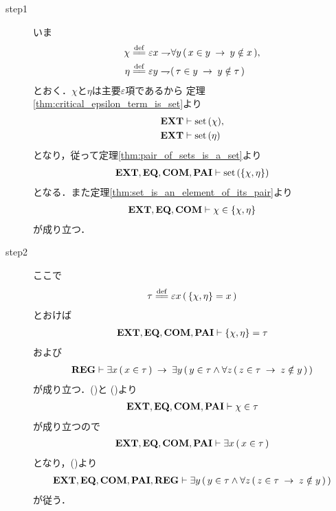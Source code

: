 	\begin{sketch}\mbox{}
		\begin{description}
			\item[step1] いま
				\begin{align}
					\chi &\defeq \varepsilon x \negation \forall y\, (\, x \in y \rarrow y \notin x\, ), \\
					\eta &\defeq \varepsilon y \negation (\, \tau \in y \rarrow y \notin \tau\, )
				\end{align}
				とおく．$\chi$と$\eta$は主要$\varepsilon$項であるから
				定理\ref{thm:critical_epsilon_term_is_set}より
				\begin{align}
					\mbox{{\bf EXT}} &\vdash \operatorname*{set}\hspace{0.15em}(\chi), \\
					\mbox{{\bf EXT}} &\vdash \operatorname*{set}\hspace{0.15em}(\eta)
				\end{align}
				となり，従って定理\ref{thm:pair_of_sets_is_a_set}より
				\begin{align}
					\mbox{{\bf EXT}},\mbox{{\bf EQ}},\mbox{\bf COM},\mbox{{\bf PAI}} \vdash \operatorname*{set}\hspace{0.15em}(\{\chi,\eta\})
				\end{align}
				となる．また定理\ref{thm:set_is_an_element_of_its_pair}より
				\begin{align}
					\mbox{{\bf EXT}},\mbox{{\bf EQ}},\mbox{\bf COM} \vdash \chi \in \{\chi,\eta\}
					\label{fom:no_pair_of_sets_go_round_1}
				\end{align}
				が成り立つ．
				
			\item[step2] ここで
				\begin{align}
					\tau \defeq \varepsilon x\, (\, \{\chi,\eta\} = x\, )
				\end{align}
				とおけば
				\begin{align}
					\mbox{{\bf EXT}},\mbox{{\bf EQ}},\mbox{\bf COM},\mbox{{\bf PAI}} \vdash \{\chi,\eta\} = \tau
					\label{fom:no_pair_of_sets_go_round_2}
				\end{align}
				および
				\begin{align}
					\mbox{{\bf REG}} \vdash \exists x\, (\, x \in \tau\, ) 
					\hspace{0.25em}\rightarrow\hspace{0.25em} \exists y\, (\, y \in \tau \wedge \forall z\, (\, z \in \tau 
					\hspace{0.25em}\rightarrow\hspace{0.25em} z \notin y\, )\, )
					\label{fom:no_pair_of_sets_go_round_3}
				\end{align}
				が成り立つ．()と
				()より
				\begin{align}
					\mbox{{\bf EXT}},\mbox{{\bf EQ}},\mbox{\bf COM},\mbox{{\bf PAI}} \vdash \chi \in \tau
					\label{fom:no_pair_of_sets_go_round_6}
				\end{align}
				が成り立つので%
				\begin{align}
					\mbox{{\bf EXT}},\mbox{{\bf EQ}},\mbox{\bf COM},\mbox{{\bf PAI}} \vdash \exists x\, (\, x \in \tau\, )
				\end{align}
				となり，()より
				\begin{align}
					\mbox{{\bf EXT}},\mbox{{\bf EQ}},\mbox{\bf COM},\mbox{{\bf PAI}},\mbox{{\bf REG}} \vdash
					\exists y\, (\, y \in \tau \wedge \forall z\, (\, z \in \tau 
					\hspace{0.25em}\rightarrow\hspace{0.25em} z \notin y\, )\, )
					\label{fom:no_pair_of_sets_go_round_10}
				\end{align}
				が従う．
				

\end{description}
\end{sketch}
